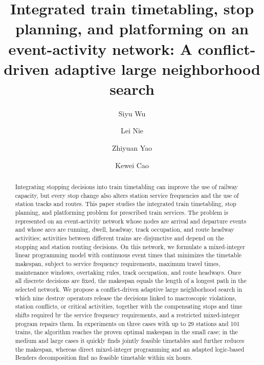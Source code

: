 \documentclass[preprint,12pt,authoryear]{elsarticle}
\begin{document}
\begin{frontmatter}

\title{Integrated train timetabling, stop planning, and platforming on an event-activity network: A conflict-driven adaptive large neighborhood search}

\author[bjtu1,bjtu2]{Siyu Wu}
\author[bjtu1,bjtu2,lzjtu]{Lei Nie}
\author[bjtu1,polyu]{Zhiyuan Yao}
\author[bjtu1,bjtu2,polyu]{Kewei Cao}

\begin{abstract}
Integrating stopping decisions into train timetabling can improve the use of railway capacity, but every stop change also alters station service frequencies and the use of station tracks and routes. This paper studies the integrated train timetabling, stop planning, and platforming problem for prescribed train services. The problem is represented on an event-activity network whose nodes are arrival and departure events and whose arcs are running, dwell, headway, track occupation, and route headway activities; activities between different trains are disjunctive and depend on the stopping and station routing decisions. On this network, we formulate a mixed-integer linear programming model with continuous event times that minimizes the timetable makespan, subject to service frequency requirements, maximum travel times, maintenance windows, overtaking rules, track occupation, and route headways. Once all discrete decisions are fixed, the makespan equals the length of a longest path in the selected network. We propose a conflict-driven adaptive large neighborhood search in which nine destroy operators release the decisions linked to macroscopic violations, station conflicts, or critical activities, together with the compensating stops and time shifts required by the service frequency requirements, and a restricted mixed-integer program repairs them. In experiments on three cases with up to 29 stations and 101 trains, the algorithm reaches the proven optimal makespan in the small case; in the medium and large cases it quickly finds jointly feasible timetables and further reduces the makespan, whereas direct mixed-integer programming and an adapted logic-based Benders decomposition find no feasible timetable within six hours.
\end{abstract}


\end{frontmatter}
\end{document}
